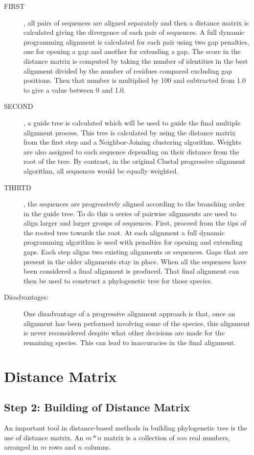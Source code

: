 \begin{description}
\item[FIRST], all pairs of sequences are aligned separately and then a distance 
matrix is calculated giving the divergence of each pair of sequences. A full 
dynamic programming alignment is calculated for each pair using two gap 
penalties, one for opening a gap and another for extending a gap. The score in the 
distance matrix is computed by taking the number of identities in the best 
alignment divided by the number of residues compared excluding gap positions. 
Then that number is multiplied by 100 and subtracted from 1.0 to give a value 
between 0 and 1.0.
\item[SECOND], a guide tree is calculated which will be used to guide the final 
multiple alignment process. This tree is calculated by using the distance matrix 
from the first step and a Neighbor-Joining clustering algorithm. Weights are also 
assigned to each sequence depending on their distance from the root of the tree. By 
contrast, in the original Clustal progressive alignment algorithm, all sequences 
would be equally weighted. 
\item[THIRTD], the sequences are progressively aligned according to the branching 
order in the guide tree. To do this a series of pairwise alignments are used to align 
larger and larger groups of sequences. First, proceed from the tips of the rooted 
tree towards the root. At each alignment a full dynamic programming algorithm is 
used with penalties for opening and extending gaps. Each step aligns two existing 
alignments or sequences. Gaps that are present in the older alignments stay in 
place. When all the sequences have been considered a final alignment is produced. 
That final alignment can then be used to construct a phylogenetic tree for those 
species. 
\item[Disadvantages:] One disadvantage of a progressive alignment approach is that, once an 
alignment has been performed involving some of the species, this alignment is 
never reconsidered despite what other decisions are made for the remaining species. 
This can lead to inaccuracies in the final alignment.
\end{description}

\section{Distance Matrix}

\subsection{Step 2: Building of Distance Matrix} \label{phase2}
An important tool in distance-based methods in building phylogenetic 
tree is the use of distance matrix. An $m*n$ matrix is a collection 
of $nm$ real numbers, arranged in $m$ rows and $n$ columns.

